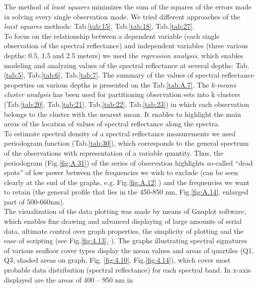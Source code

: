\documentclass[11pt]{article}
\begin{document}
The method of \textit{least squares} minimizes the sum of the squares of the errors made in solving every single observation made. We tried different approaches of the \textit{least squares} methods: Tab.\ref{tab:15}, Tab.\ref{tab:18}, Tab.\ref{tab:27}.\\
To focus on the relationship between a dependent variable (each single observation of the spectral reflectance) and independent variables (three various depths: 0.5, 1.5 and 2.5 meters) we used the \textit{regression analysis}, which enables modeling and analyzing values of the spectral reflectance at several depths: Tab.\ref{tab:5}, Tab.\ref{tab:6}, Tab.\ref{tab:7}. 
The summary of the values of spectral reflectance properties on various depths is presented on the Tab.\ref{tab:A.7}.
The \textit{k-means cluster analysis} has been used for partitioning observation sets into k clusters (Tab.\ref{tab:20}, Tab.\ref{tab:21}, Tab.\ref{tab:22}, Tab.\ref{tab:23}) in which each observation belongs to the cluster with the nearest mean.
It enables to highlight the main areas of the location of values of spectral reflectance along the spectra.\\
To estimate spectral density of a spectral reflectance measurements we used periodogram function (Tab.\ref{tab:30}), which corresponds to the general spectrum of the observations with representation of a variable quantity.  
Thus, the periodogram (Fig.\ref{fig:A.31}) of the series of observation highlights so-called “dead spots” of low power between the frequencies we wish to exclude (can be seen clearly at the end of the graphs, e.g. Fig.\ref{fig:A.12} ) 
and the frequencies we want to retain (the general profile that lies in the 450-850 nm, Fig.\ref{fig:A.14}, enlarged part of 500-660nm).\\
The visualization of the data plotting was made by means of Gnuplot software, which enables fine
drawing and advanced displaying of large amounts of serial data, ultimate control over graph properties, 
the simplicity of plotting and the ease of scripting (see Fig.\ref{fig:4.13}, ).
The graphs illustrating spectral signatures of various seafloor cover types display the mean values and
areas of quartiles (Q1, Q3, shaded areas on graph, Fig. \ref{fig:4.10}, Fig.\ref{fig:4.14}), which cover most probable data distribution (spectral reflectance) for each spectral band. In x-axis displayed are the areas of 400 – 950 nm in
\end{document}

